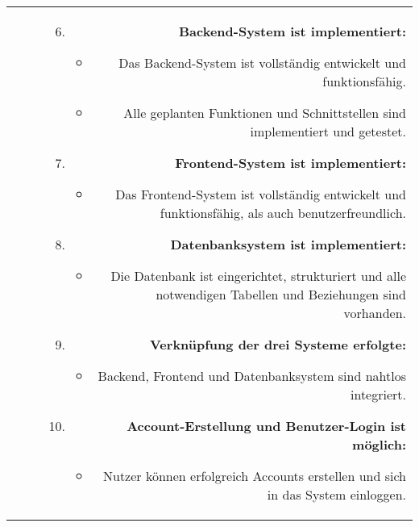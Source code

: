 \begin{tabularx}{\textwidth}{L R}
\begin{enumerate}[left=0pt,label=\arabic*.,itemsep=0.4cm]
        \end{enumerate}
        &
        \begin{enumerate}[left=0pt,label=\arabic*.,itemsep=0.4cm]
            \setcounter{enumi}{5}
            \small

            \item \textbf{Backend-System ist implementiert:}
            \begin{itemize}[leftmargin=*]
                \item Das Backend-System ist vollständig entwickelt und funktionsfähig.
                \item Alle geplanten Funktionen und Schnittstellen sind implementiert und getestet.
            \end{itemize}

            \item \textbf{Frontend-System ist implementiert:}
            \begin{itemize}[leftmargin=*]
                \item Das Frontend-System ist vollständig entwickelt und funktionsfähig, als auch benutzerfreundlich.
            \end{itemize}

            \item \textbf{Datenbanksystem ist implementiert:}
            \begin{itemize}[leftmargin=*]
                \item Die Datenbank ist eingerichtet, strukturiert und alle notwendigen Tabellen und Beziehungen sind vorhanden.
            \end{itemize}

            \item \textbf{Verknüpfung der drei Systeme erfolgte:}
            \begin{itemize}[leftmargin=*]
                \item Backend, Frontend und Datenbanksystem sind nahtlos integriert.
            \end{itemize}

            \item \textbf{Account-Erstellung und Benutzer-Login ist möglich:}
            \begin{itemize}[leftmargin=*]
                \item Nutzer können erfolgreich Accounts erstellen und sich in das System einloggen.
            \end{itemize}


\end{enumerate}
\end{tabularx}
